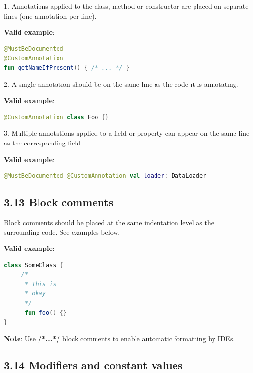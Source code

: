 1. Annotations applied to the class, method or constructor are placed on separate lines (one annotation per line). 



\textbf{Valid example}:

\begin{lstlisting}[language=Kotlin]
@MustBeDocumented
@CustomAnnotation
fun getNameIfPresent() { /* ... */ }
\end{lstlisting}


2. A single annotation should be on the same line as the code it is annotating.



\textbf{Valid example}:

\begin{lstlisting}[language=Kotlin]
@CustomAnnotation class Foo {}
\end{lstlisting}


3. Multiple annotations applied to a field or property can appear on the same line as the corresponding field.



\textbf{Valid example}:

\begin{lstlisting}[language=Kotlin]
@MustBeDocumented @CustomAnnotation val loader: DataLoader
\end{lstlisting}


\subsection*{\textbf{3.13 Block comments}}

\label{sec:3.13}



Block comments should be placed at the same indentation level as the surrounding code. See examples below.



\textbf{Valid example}:



\begin{lstlisting}[language=Kotlin]
class SomeClass {
     /*
      * This is
      * okay
      */
      fun foo() {}
}
\end{lstlisting}


\textbf{Note}: Use \textbf{/*...*/} block comments to enable automatic formatting by IDEs.



\subsection*{\textbf{3.14 Modifiers and constant values}}

